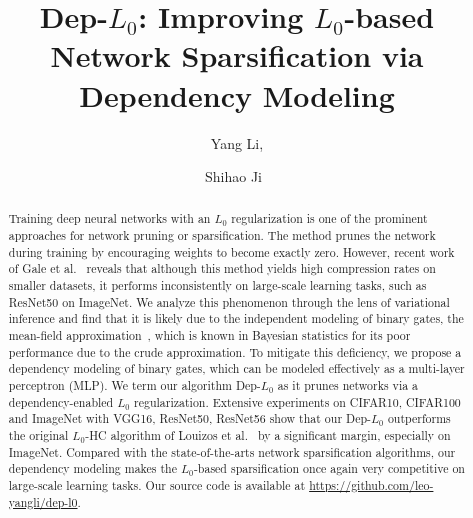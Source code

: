 \documentclass[runningheads, envcountsame, a4paper]{llncs}
\begin{document}
%
\title{Dep-$L_0$: Improving $L_0$-based Network Sparsification via  Dependency Modeling}
%
%
\author{Yang Li, \and
Shihao Ji~\Letter}
%
%
%
\maketitle              %
%
\begin{abstract}
    Training deep neural networks with an $L_0$ regularization is one of the prominent approaches for network pruning or sparsification. The method prunes the network during training by encouraging weights to become exactly zero. However, recent work of Gale et al.~\cite{gale2019state} reveals that although this method yields high compression rates on smaller datasets, it performs inconsistently on large-scale learning tasks, such as ResNet50 on ImageNet. We analyze this phenomenon through the lens of variational inference and find that it is likely due to the independent modeling of binary gates, the mean-field approximation~\cite{viBlei}, which is known in Bayesian statistics for its poor performance due to the crude approximation. To mitigate this deficiency, we propose a dependency modeling of binary gates, which can be modeled effectively as a multi-layer perceptron (MLP). We term our algorithm Dep-$L_0$ as it prunes networks via a dependency-enabled $L_0$ regularization. Extensive experiments on CIFAR10, CIFAR100 and ImageNet with VGG16, ResNet50, ResNet56 show that our Dep-$L_0$ outperforms the original $L_0$-HC algorithm of Louizos et al.~\cite{louizos2017learning} by a significant margin, especially on ImageNet. Compared with the state-of-the-arts network sparsification algorithms, our dependency modeling makes the $L_0$-based sparsification once again very competitive on large-scale learning tasks. Our source code is available at \url{https://github.com/leo-yangli/dep-l0}.


\end{abstract}
%
%
%
\end{document}
